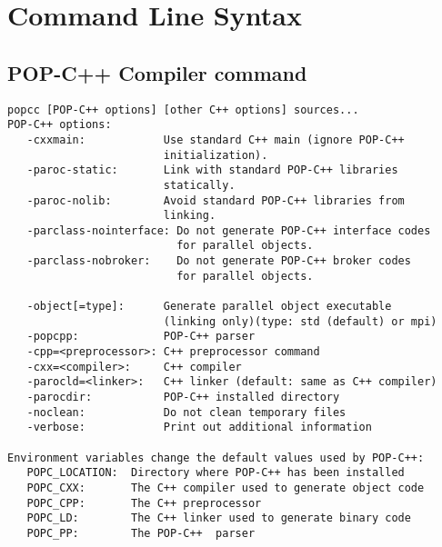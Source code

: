 \chapter{Command Line Syntax}

\section{POP-C++ Compiler command}

\begin{verbatim} 
popcc [POP-C++ options] [other C++ options] sources...
POP-C++ options:
   -cxxmain:            Use standard C++ main (ignore POP-C++ 
                        initialization).
   -paroc-static:       Link with standard POP-C++ libraries 
                        statically.
   -paroc-nolib:        Avoid standard POP-C++ libraries from 
                        linking.
   -parclass-nointerface: Do not generate POP-C++ interface codes 
                          for parallel objects.
   -parclass-nobroker:    Do not generate POP-C++ broker codes 
                          for parallel objects.

   -object[=type]:      Generate parallel object executable 
                        (linking only)(type: std (default) or mpi)
   -popcpp:             POP-C++ parser
   -cpp=<preprocessor>: C++ preprocessor command
   -cxx=<compiler>:     C++ compiler
   -parocld=<linker>:   C++ linker (default: same as C++ compiler)
   -parocdir:           POP-C++ installed directory
   -noclean:            Do not clean temporary files
   -verbose:            Print out additional information

Environment variables change the default values used by POP-C++:
   POPC_LOCATION:  Directory where POP-C++ has been installed
   POPC_CXX:       The C++ compiler used to generate object code
   POPC_CPP:       The C++ preprocessor
   POPC_LD:        The C++ linker used to generate binary code
   POPC_PP:        The POP-C++  parser
\end{verbatim}
